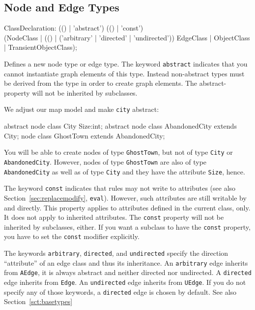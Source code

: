 \subsection{Node and Edge Types}\label{nodeandedgetypes}
\begin{rail}
  ClassDeclaration: (() | 'abstract') (() | 'const') \\
    (NodeClass | (() | ('arbitrary' | 'directed' | 'undirected')) EdgeClass | ObjectClass | TransientObjectClass);
\end{rail}
Defines a new node type or edge type.
The keyword \texttt{abstract} indicates that you cannot instantiate graph elements of this type.
Instead non-abstract types must be derived from the type in order to create graph elements.
The abstract-property will not be inherited by subclasses.

\begin{example}
We adjust our map model and make \texttt{city} abstract:
\begin{grgen}
abstract node class City {
  Size:int;
}
abstract node class AbandonedCity extends City;
node class GhostTown extends AbandonedCity;
\end{grgen}
You will be able to create nodes of type \texttt{GhostTown}, but not of type \texttt{City} or \texttt{AbandonedCity}.
However, nodes of type \texttt{GhostTown} are also of type \texttt{AbandonedCity} as well as of type \texttt{City} and they have the attribute \texttt{Size}, hence.
\end{example}
The keyword \texttt{const} indicates that rules may not write to attributes (see also Section~\ref{sec:replacemodify}, \texttt{eval}).
However, such attributes are still writable by \LibGr{} and \GrShell{} directly. This property applies to attributes defined in the current class, only.
It does not apply to inherited attributes.
The \texttt{const} property will not be inherited by subclasses, either.
If you want a subclass to have the \texttt{const} property, you have to set the \texttt{const} modifier explicitly.

The keywords \texttt{arbitrary}, \texttt{directed}, and \texttt{undirected} specify the direction ``attribute'' of an edge class and thus its inheritance.
An \texttt{arbitrary} edge inherits from \texttt{AEdge}, it is always abstract and neither directed nor undirected.
A \texttt{directed} edge inherits from \texttt{Edge}.
An \texttt{undirected} edge inherits from \texttt{UEdge}.
If you do not specify any of those keywords, a \texttt{directed} edge is chosen by default.
See also Section~\ref{sct:basetypes}

